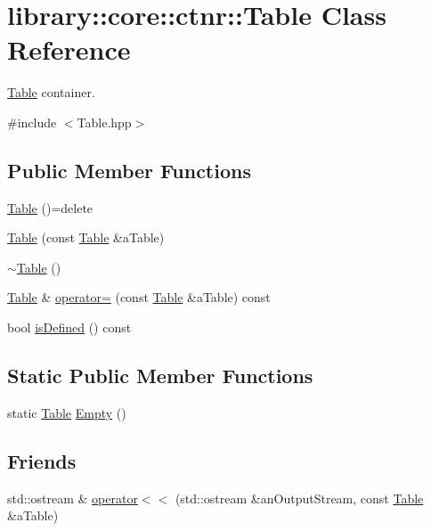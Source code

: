 \hypertarget{classlibrary_1_1core_1_1ctnr_1_1_table}{}\section{library\+:\+:core\+:\+:ctnr\+:\+:Table Class Reference}
\label{classlibrary_1_1core_1_1ctnr_1_1_table}


\hyperlink{classlibrary_1_1core_1_1ctnr_1_1_table}{Table} container.  




{\ttfamily \#include $<$Table.\+hpp$>$}

\subsection*{Public Member Functions}
\begin{DoxyCompactItemize}
\item 
\hyperlink{classlibrary_1_1core_1_1ctnr_1_1_table_a5c88870b3e09883ccaa6e58f26de6b02}{Table} ()=delete
\item 
\hyperlink{classlibrary_1_1core_1_1ctnr_1_1_table_afaaf450a1a4949b48b6290460137921e}{Table} (const \hyperlink{classlibrary_1_1core_1_1ctnr_1_1_table}{Table} \&a\+Table)
\item 
\hyperlink{classlibrary_1_1core_1_1ctnr_1_1_table_a8cdd20d9cd30399a4611b0b8cd2894d5}{$\sim$\+Table} ()
\item 
\hyperlink{classlibrary_1_1core_1_1ctnr_1_1_table}{Table} \& \hyperlink{classlibrary_1_1core_1_1ctnr_1_1_table_af1d446ec74df66da7bd1eb3ff2d6bb55}{operator=} (const \hyperlink{classlibrary_1_1core_1_1ctnr_1_1_table}{Table} \&a\+Table) const
\item 
bool \hyperlink{classlibrary_1_1core_1_1ctnr_1_1_table_af2777d4233cd7caa7cc81b3b957c3a0c}{is\+Defined} () const
\end{DoxyCompactItemize}
\subsection*{Static Public Member Functions}
\begin{DoxyCompactItemize}
\item 
static \hyperlink{classlibrary_1_1core_1_1ctnr_1_1_table}{Table} \hyperlink{classlibrary_1_1core_1_1ctnr_1_1_table_a75089c496f8aac71e374616d55a78e03}{Empty} ()
\end{DoxyCompactItemize}
\subsection*{Friends}
\begin{DoxyCompactItemize}
\item 
std\+::ostream \& \hyperlink{classlibrary_1_1core_1_1ctnr_1_1_table_afaece709b2f143e4011941ae67b7adba}{operator$<$$<$} (std\+::ostream \&an\+Output\+Stream, const \hyperlink{classlibrary_1_1core_1_1ctnr_1_1_table}{Table} \&a\+Table)
\end{DoxyCompactItemize}



